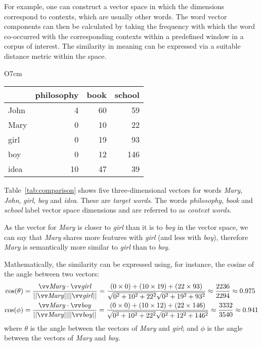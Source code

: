 For example, one can construct a vector space in which the dimensions correspond to contexts, which are usually other words. The word vector components can then be calculated by taking the frequency with which the word co-occurred with the corresponding contexts within a predefined window in a corpus of interest. The similarity in meaning can be expressed via a suitable distance metric within the space.

\begin{wraptable}[9]{O}{7cm}
  \centering
  \vspace{-1em}
  \begin{tabular}{lrrr}
    \toprule
    & philosophy & book & school \\
    \midrule
    John & 4  & 60 & 59  \\
    Mary & 0  & 10 & 22  \\
    girl & 0  & 19 & 93  \\
    boy  & 0  & 12 & 146 \\
    idea & 10 & 47 & 39  \\
    \bottomrule
  \end{tabular}
  \caption{Word co-occurrence frequencies extracted from the BNC}
  \label{tab:comparison}
\end{wraptable}

Table~\ref{tab:comparison} shows five three-dimensional vectors for words \textit{Mary}, \textit{John}, \textit{girl}, \textit{boy} and \textit{idea}. These are \textit{target words}.  The words \textit{philosophy}, \textit{book} and \textit{school} label vector space dimensions and are referred to as \emph{context words}.

As the vector for \textit{Mary} is closer to \textit{girl} than it is to \textit{boy} in the vector space, we can say that \textit{Mary} shares more features with \textit{girl} (and less  with \textit{boy}), therefore \textit{Mary} is semantically more similar to \textit{girl} than to \textit{boy}.

Mathematically, the similarity can be expressed using, for instance, the cosine of the angle between two vectors:
%
\begin{align*}
\cos(\theta) &=
\frac{\ov{\mathit{Mary}}\cdot\ov{\mathit{girl}}}
{||\ov{\mathit{Mary}}||||\ov{\mathit{girl}}||} =
%
\frac{(0\times0) + (10\times19) + (22\times93)}
%
%
%
{\sqrt{0^2 + 10^2 + 22^2}\sqrt{0^2 + 19^2 + 93^2}} \approx
\frac{2236}{2294} \approx 0.975
 \\
\cos(\phi) &=
\frac{\ov{\mathit{Mary}}\cdot\ov{\mathit{boy}}}
{||\ov{\mathit{Mary}}||||\ov{\mathit{boy}}||} =
%
\frac{(0\times0) + (10\times12) + (22\times146)}
{\sqrt{0^2 + 10^2 + 22^2}\sqrt{0^2 + 12^2 + 146^2}} \approx
\frac{3332}{3540} \approx 0.941
\end{align*}
%
where $\theta$ is the angle between the vectors of \textit{Mary} and \textit{girl}; and $\phi$ is the angle between the vectors of \textit{Mary} and \textit{boy}.

